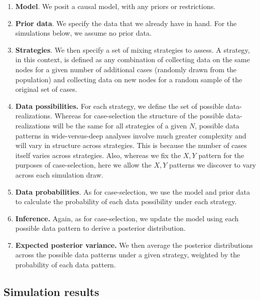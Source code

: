 \documentclass[
  12pt,
]{book}
\providecommand{\tightlist}{%
  \setlength{\itemsep}{0pt}\setlength{\parskip}{0pt}}
\begin{document}
\begin{enumerate}
\def\labelenumi{\arabic{enumi}.}
\tightlist
\item
  \textbf{Model}. We posit a causal model, with any priors or restrictions.
\item
  \textbf{Prior data}. We specify the data that we already have in hand. For the simulations below, we assume no prior data.
\item
  \textbf{Strategies}. We then specify a set of mixing strategies to assess. A strategy, in this context, is defined as any combination of collecting data on the same nodes for a given number of additional cases (randomly drawn from the population) and collecting data on new nodes for a random sample of the original set of cases.
\item
  \textbf{Data possibilities.} For each strategy, we define the set of possible data-realizations. Whereas for case-selection the structure of the possible data-realizations will be the same for all strategies of a given \(N\), possible data patterns in wide-versus-deep analyses involve much greater complexity and will vary in structure across strategies. This is because the number of cases itself varies across strategies. Also, whereas we fix the \(X,Y\) pattern for the purposes of case-selection, here we allow the \(X,Y\) patterns we discover to vary across each simulation draw.
\item
  \textbf{Data probabilities}. As for case-selection, we use the model and prior data to calculate the probability of each data possibility under each strategy.
\item
  \textbf{Inference.} Again, as for case-selection, we update the model using each possible data pattern to derive a posterior distribution.
\item
  \textbf{Expected posterior variance.} We then average the posterior distributions across the possible data patterns under a given strategy, weighted by the probability of each data pattern.
\end{enumerate}

\hypertarget{simulation-results-2}{%
\subsection{Simulation results}\label{simulation-results-2}}
\end{document}
